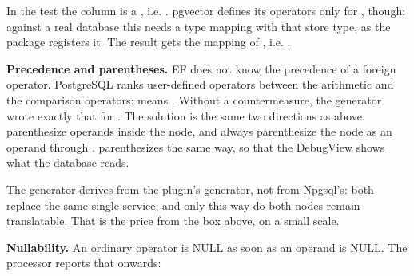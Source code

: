 In the test the column is a , i.e. . pgvector defines its operators
only for , though; against a real database this needs a type mapping with that
store type, as the package registers it. The result gets the mapping of , i.e.
.

\textbf{Precedence and parentheses.} EF does not know the precedence of a foreign operator.
PostgreSQL ranks user-defined operators between the arithmetic and the comparison operators:
 means
. Without a countermeasure, the
generator wrote exactly that for
. The solution is the same two directions as above: parenthesize operands inside the node,
and always parenthesize the node as an operand through
.  parenthesizes the same way, so that the
DebugView shows what the database reads.


The generator derives from the plugin's generator, not from Npgsql's: both replace the same
single service, and only this way do both nodes remain translatable. That is the price from the
box above, on a small scale.

\textbf{Nullability.} An ordinary operator is NULL as soon as an operand is NULL. The processor
reports that onwards:

